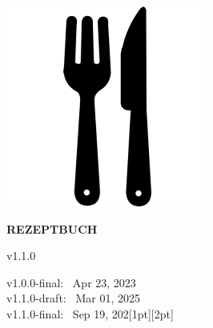 \documentclass[a4paper, 11pt]{article}
\newenvironment{sf-mono}{\small\sfm}{}
\newcommand{\txtrecipebook}{%
    \uppercase{Rezeptbuch}%
}
\newcommand{\txtversion}{%
    v1.1.0%
}
\begin{document}


    \begin{titlepage}
        \begin{center}
            \vspace*{\fill}
            \includegraphics[scale=0.67]{img/fork_and_knife.pdf}\\
            \vspace*{0.8cm}
            \begin{LARGE}
                \gc\textbf{\txtrecipebook}\\
            \end{LARGE}
            \vspace*{0.5cm}
            \begin{large}
                \txtversion
            \end{large}
            \vspace*{\fill}
        \end{center}
    \end{titlepage}


    \newpage
    \begin{raggedright}
        \vspace*{\fill}
        \begin{sf-mono}
            v1.0.0-final: \ Apr 23, 2023\\
            v1.1.0-draft: \ Mar 01, 2025\\
            v1.1.0-final: \ Sep 19, 202{\raisebox{0pt}[1pt][2pt]{\colorbox{black}{\makebox[1pt]{\textcolor{white}{5}}}}}\\
        \end{sf-mono}
    \end{raggedright}
    \newpage


    \tableofcontents
    \newpage{}


    

\end{document}
